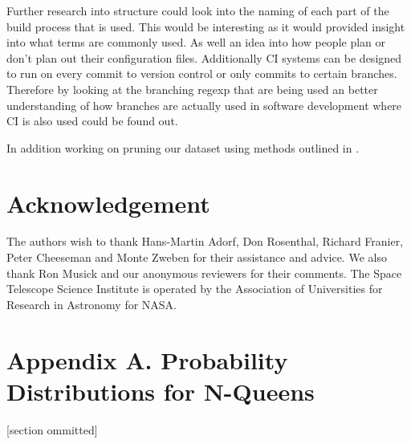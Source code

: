 \documentclass[twoside,12pt,titlepage,a4paper]{article}
\begin{document}
Further research into structure could look into the naming of each part of the build process that is used. This would be interesting as it would provided insight into what terms are commonly used. As well an idea into how people plan or don't plan out their configuration files.
Additionally CI systems can be designed to run on every commit to version control or only commits to certain branches. Therefore by looking at the branching regexp that are being used an better understanding of how branches are actually used in software development where CI is also used could be found out.

In addition working on pruning our dataset using methods outlined in \cite{Kalliamvakou2014}. 




\section{Acknowledgement}
The authors wish to thank Hans-Martin Adorf, Don Rosenthal, 
Richard Franier, Peter Cheeseman and Monte Zweben for their assistance
and advice.  We also thank Ron Musick and our anonymous reviewers for
their comments.  The Space Telescope Science Institute is operated by
the Association of Universities for Research in Astronomy for NASA.

\appendix
\section*{Appendix A. Probability Distributions for N-Queens}


[section ommitted]



\vskip 0.2in


\end{document}
